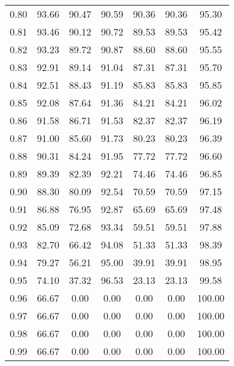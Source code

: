 \begin{tabular}{|c|c|c|c|c|c|c|}
      0.80 &     93.66 &     90.47 &      90.59 &   90.36 &      90.36 &         95.30 \\
      0.81 &     93.46 &     90.12 &      90.72 &   89.53 &      89.53 &         95.42 \\
      0.82 &     93.23 &     89.72 &      90.87 &   88.60 &      88.60 &         95.55 \\
      0.83 &     92.91 &     89.14 &      91.04 &   87.31 &      87.31 &         95.70 \\
      0.84 &     92.51 &     88.43 &      91.19 &   85.83 &      85.83 &         95.85 \\
      0.85 &     92.08 &     87.64 &      91.36 &   84.21 &      84.21 &         96.02 \\
      0.86 &     91.58 &     86.71 &      91.53 &   82.37 &      82.37 &         96.19 \\
      0.87 &     91.00 &     85.60 &      91.73 &   80.23 &      80.23 &         96.39 \\
      0.88 &     90.31 &     84.24 &      91.95 &   77.72 &      77.72 &         96.60 \\
      0.89 &     89.39 &     82.39 &      92.21 &   74.46 &      74.46 &         96.85 \\
      0.90 &     88.30 &     80.09 &      92.54 &   70.59 &      70.59 &         97.15 \\
      0.91 &     86.88 &     76.95 &      92.87 &   65.69 &      65.69 &         97.48 \\
      0.92 &     85.09 &     72.68 &      93.34 &   59.51 &      59.51 &         97.88 \\
      0.93 &     82.70 &     66.42 &      94.08 &   51.33 &      51.33 &         98.39 \\
      0.94 &     79.27 &     56.21 &      95.00 &   39.91 &      39.91 &         98.95 \\
      0.95 &     74.10 &     37.32 &      96.53 &   23.13 &      23.13 &         99.58 \\
      0.96 &     66.67 &      0.00 &       0.00 &    0.00 &       0.00 &        100.00 \\
      0.97 &     66.67 &      0.00 &       0.00 &    0.00 &       0.00 &        100.00 \\
      0.98 &     66.67 &      0.00 &       0.00 &    0.00 &       0.00 &        100.00 \\
      0.99 &     66.67 &      0.00 &       0.00 &    0.00 &       0.00 &        100.00 \\
\bottomrule
\end{tabular}
